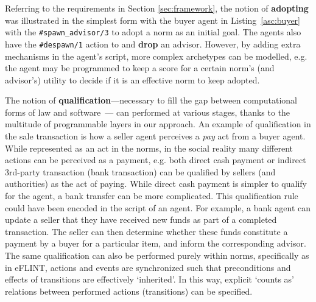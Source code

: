 Referring to the requirements in Section \ref{sec:framework}, the notion of \textbf{adopting} was illustrated in the simplest form with the buyer agent in Listing~\ref{asc:buyer} with the \texttt{#spawn_advisor/3} to adopt a norm as an initial goal. The agents also have the \texttt{#despawn/1} action to and \textbf{drop} an advisor. 
However, by adding extra mechanisms in the agent's script, more complex archetypes can be modelled, e.g. the agent may be programmed to keep a score for a certain norm's (and advisor's) utility to decide if it is an effective norm to keep adopted. 

%
The notion of \textbf{qualification}---necessary to fill the gap between computational forms of law and software~\cite{Boella2014APractice}---
%
can performed at various stages, thanks to the %
multitude of programmable layers in our approach.
%
An example of qualification in the sale transaction is how a seller agent perceives a \textit{pay} act from a buyer agent.
%
While represented as an act in the norms, in the social reality many different actions can be perceived as a payment, e.g. both direct cash payment or indirect 3rd-party transaction (bank transaction) can be qualified by sellers (and authorities) as the act of paying. While direct cash payment is simpler to qualify for the agent, a bank transfer can be more complicated.
%
This qualification rule could have been encoded in the script of an agent.
%
For example, a bank agent can update a seller that they have received new funds as part of a completed transaction.
%
The seller can then determine whether these funds constitute a payment by a buyer for a particular item, and inform the corresponding advisor.
%
%
The same qualification can also be performed purely within norms, specifically as in eFLINT, actions and events are synchronized such that preconditions and effects of %
transitions are effectively `inherited'. %
%
In this way, explicit `counts as' relations between performed actions (transitions) can be specified.

